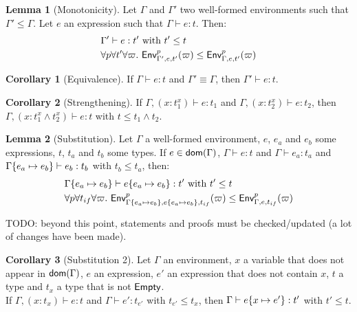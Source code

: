 \documentclass[a4paper]{article}
\theoremstyle{definition}
\newtheorem{lemma}{Lemma}
\newtheorem{corollary}{Corollary}
\begin{document}
        \begin{lemma}[Monotonicity]
          Let $\Gamma$ and $\Gamma'$ two well-formed environments such that $\Gamma' \leq \Gamma$. Let $e$ an expression such that $\Gamma \vdash e:t$.
          Then:\\
          \begin{align*}
            &\Gamma' \vdash e:t' \text{ with } t' \leq t\\
            &\forall p \forall t' \forall \varpi.\ \textsf{Env}^{p}_{\Gamma',e,t'} (\varpi) \leq \textsf{Env}^{p}_{\Gamma,e,t'} (\varpi)
          \end{align*}
        \end{lemma}
    
        \begin{corollary}[Equivalence]
          If $\Gamma \vdash e:t$ and $\Gamma' \equiv \Gamma$, then $\Gamma' \vdash e:t$.
        \end{corollary}
    
        \begin{corollary}[Strengthening]
          If $\Gamma, (x:t_1^x) \vdash e:t_1$ and $\Gamma, (x:t_2^x) \vdash e:t_2$, then
          $\Gamma, (x:t_1^x\land t_2^x) \vdash e:t$ with $t \leq t_1\land t_2$.
        \end{corollary}
    
        \begin{lemma}[Substitution]
          Let $\Gamma$ a well-formed environment, $e$, $e_a$ and $e_b$ some expressions, $t$, $t_a$ and $t_b$ some types.
          If $e \in \textsf{dom}(\Gamma)$, $\Gamma \vdash e:t$ and $\Gamma \vdash e_a : t_a$ and $\Gamma\{e_a \mapsto e_b\} \vdash e_b:t_b$ with $t_b \leq t_a$, then:
          \begin{align*}
            &\Gamma \{e_a \mapsto e_b\} \vdash e \{e_a \mapsto e_b\}:t' \text{ with } t'\leq t\\
            &\forall p \forall t_{if} \forall \varpi.\ \textsf{Env}^{p}_{\Gamma\{e_a \mapsto e_b\},e\{e_a \mapsto e_b\},t_{if}} (\varpi) \leq \textsf{Env}^{p}_{\Gamma,e,t_{if}} (\varpi)
          \end{align*}
        \end{lemma}
    
        TODO: beyond this point, statements and proofs must be checked/updated (a lot of changes have been made).

        \begin{corollary}[Substitution 2]
          Let $\Gamma$ an environment, $x$ a variable that does not appear in $\textsf{dom}(\Gamma)$, $e$ an expression, $e'$ an expression that does not contain $x$, $t$ a type and $t_x$ a type that is not $\textsf{Empty}$.\\
          If $\Gamma, (x:t_x) \vdash e:t$ and $\Gamma \vdash e':t_{e'}$ with $t_{e'} \leq t_x$, then $\Gamma \vdash e \{x \mapsto e'\}:t'$ with $t'\leq t$.
        \end{corollary}
    
\end{document}
